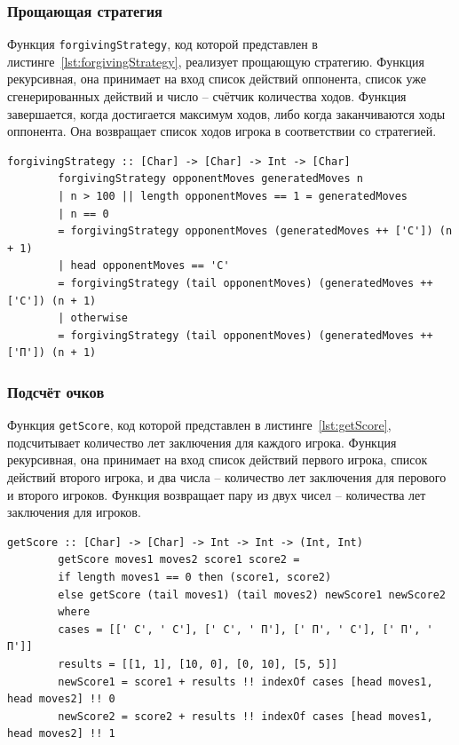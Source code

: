 \documentclass[a4paper, final]{article}
\begin{document}
	\subsubsection{Прощающая стратегия}
	
	Функция \texttt{forgivingStrategy}, код которой представлен в листинге~\ref{lst:forgivingStrategy}, реализует прощающую стратегию. Функция рекурсивная, она принимает на вход список действий оппонента, список уже сгенерированных действий и число -- счётчик количества ходов. Функция завершается, когда достигается максимум ходов, либо когда заканчиваются ходы оппонента. Она возвращает список ходов игрока в соответствии со стратегией.
	
	\begin{lstlisting}[caption={Код функции, реализующей прощающую стратегию.}, label={lst:forgivingStrategy}]
		forgivingStrategy :: [Char] -> [Char] -> Int -> [Char]
		forgivingStrategy opponentMoves generatedMoves n
		| n > 100 || length opponentMoves == 1 = generatedMoves
		| n == 0                               
		= forgivingStrategy opponentMoves (generatedMoves ++ ['С']) (n + 1)
		| head opponentMoves == 'С'            
		= forgivingStrategy (tail opponentMoves) (generatedMoves ++ ['С']) (n + 1)
		| otherwise                            
		= forgivingStrategy (tail opponentMoves) (generatedMoves ++ ['П']) (n + 1)
	\end{lstlisting}
	
	\subsubsection{Подсчёт очков}
	Функция \texttt{getScore}, код которой представлен в листинге~\ref{lst:getScore}, подсчитывает количество лет заключения для каждого игрока. Функция рекурсивная, она принимает на вход список действий первого игрока, список действий второго игрока, и два числа -- количество лет заключения для перового и второго игроков. Функция возвращает пару из двух чисел -- количества лет заключения для игроков.
	
	\begin{lstlisting}[caption={Код функции для подсчёта лет заключения.}, label={lst:getScore}]
		getScore :: [Char] -> [Char] -> Int -> Int -> (Int, Int)
		getScore moves1 moves2 score1 score2 =
		if length moves1 == 0 then (score1, score2)
		else getScore (tail moves1) (tail moves2) newScore1 newScore2
		where 
		cases = [[' С', ' С'], [' С', ' П'], [' П', ' С'], [' П', ' П']]
		results = [[1, 1], [10, 0], [0, 10], [5, 5]]
		newScore1 = score1 + results !! indexOf cases [head moves1, head moves2] !! 0
		newScore2 = score2 + results !! indexOf cases [head moves1, head moves2] !! 1
	\end{lstlisting}
	
\end{document}

